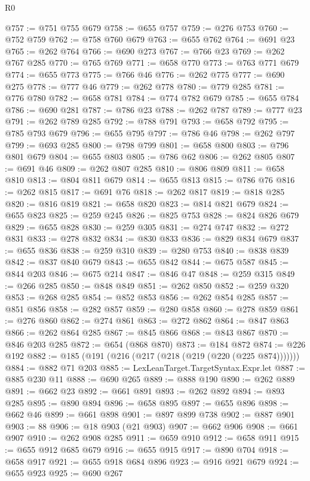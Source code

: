 \begin{lexlean}{R0}
\begin{coremodule}
@757 := @751 @755 @679
@758 := @655 @757
@759 := @276 @753
@760 := @752 @759
@762 := @758 @760 @679
@763 := @655 @762
@764 := @691 @23
@765 := @262 @764
@766 := @690 @273
@767 := @766 @23
@769 := @262 @767 @285
@770 := @765 @769
@771 := @658 @770
@773 := @763 @771 @679
@774 := @655 @773
@775 := @766 @46
@776 := @262 @775
@777 := @690 @275
@778 := @777 @46
@779 := @262 @778
@780 := @779 @285
@781 := @776 @780
@782 := @658 @781
@784 := @774 @782 @679
@785 := @655 @784
@786 := @690 @281
@787 := @786 @23
@788 := @262 @787
@789 := @777 @23
@791 := @262 @789 @285
@792 := @788 @791
@793 := @658 @792
@795 := @785 @793 @679
@796 := @655 @795
@797 := @786 @46
@798 := @262 @797
@799 := @693 @285
@800 := @798 @799
@801 := @658 @800
@803 := @796 @801 @679
@804 := @655 @803
@805 := @786 @62
@806 := @262 @805
@807 := @691 @46
@809 := @262 @807 @285
@810 := @806 @809
@811 := @658 @810
@813 := @804 @811 @679
@814 := @655 @813
@815 := @786 @76
@816 := @262 @815
@817 := @691 @76
@818 := @262 @817
@819 := @818 @285
@820 := @816 @819
@821 := @658 @820
@823 := @814 @821 @679
@824 := @655 @823
@825 := @259 @245
@826 := @825 @753
@828 := @824 @826 @679
@829 := @655 @828
@830 := @259 @305
@831 := @274 @747
@832 := @272 @831
@833 := @278 @832
@834 := @830 @833
@836 := @829 @834 @679
@837 := @655 @836
@838 := @259 @310
@839 := @280 @753
@840 := @838 @839
@842 := @837 @840 @679
@843 := @655 @842
@844 := @675 @587
@845 := @844 @203
@846 := @675 @214
@847 := @846 @47
@848 := @259 @315
@849 := @266 @285
@850 := @848 @849
@851 := @262 @850
@852 := @259 @320
@853 := @268 @285
@854 := @852 @853
@856 := @262 @854 @285
@857 := @851 @856
@858 := @282 @857
@859 := @280 @858
@860 := @278 @859
@861 := @276 @860
@862 := @274 @861
@863 := @272 @862
@864 := @847 @863
@866 := @262 @864 @285
@867 := @845 @866
@868 := @843 @867
@870 := @846 @203 @285
@872 := @654 (@868 @870)
@873 := @184 @872
@874 := @226 @192
@882 := @185 (@191 (@216 (@217 (@218 (@219 (@220 (@225 @874)))))))
@884 := @882 @71 @203
@885 := LexLeanTarget.TargetSyntax.Expr.let
@887 := @885 @230 @11
@888 := @690 @265
@889 := @888 @190
@890 := @262 @889
@891 := @662 @23
@892 := @661 @891
@893 := @262 @892
@894 := @893 @285
@895 := @890 @894
@896 := @658 @895
@897 := @655 @896
@898 := @662 @46
@899 := @661 @898
@901 := @897 @899 @738
@902 := @887 @901
@903 := 88
@906 := @18 @903 (@21 @903)
@907 := @662 @906
@908 := @661 @907
@910 := @262 @908 @285
@911 := @659 @910
@912 := @658 @911
@915 := @655 @912 @685 @679
@916 := @655 @915
@917 := @890 @704
@918 := @658 @917
@921 := @655 @918 @684 @896
@923 := @916 @921 @679
@924 := @655 @923
@925 := @690 @267

\end{coremodule}
\end{lexlean}

